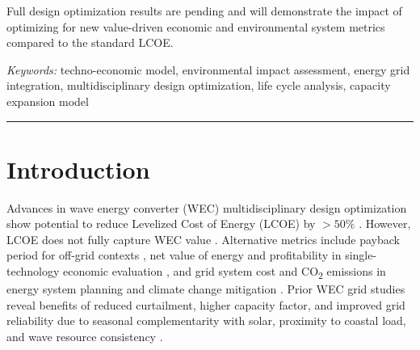 \documentclass[10pt,twoside]{article}
\begin{document}
Full design optimization results are pending and will demonstrate the impact of optimizing for new value-driven economic and environmental system metrics compared to the standard LCOE.
 \hfill 

\vspace{.5\baselineskip}
\textit{Keywords:} techno-economic model, environmental impact assessment, energy grid integration, multidisciplinary design optimization, life cycle analysis, capacity expansion model

\noindent\rule{\textwidth}{0.4pt}

\section{Introduction}
Advances in wave energy converter (WEC) multidisciplinary design optimization show potential to reduce Levelized Cost of Energy (LCOE) by $>50\%$ \cite{mccabe_leveraging_2025}.
However, LCOE does not fully capture WEC value \cite{mowers_evaluation_2021,moraski_beyond_2025}.
Alternative metrics include payback period for off-grid contexts \cite{jenne_powering_2021}, net value of energy and profitability in single-technology economic evaluation \cite{mowers_evaluation_2021,makaremi_economic_2025}, and grid system cost and CO\textsubscript{2} emissions in energy system planning and climate change mitigation \cite{moraski_beyond_2025}.
Prior WEC grid studies reveal benefits of reduced curtailment, higher capacity factor, and improved grid reliability due to seasonal complementarity with solar, proximity to coastal load, and wave resource consistency \cite{akdemir_opportunities_2023,bhattacharya_timing_2021,pennock_temporal_2022}.
\end{document}
